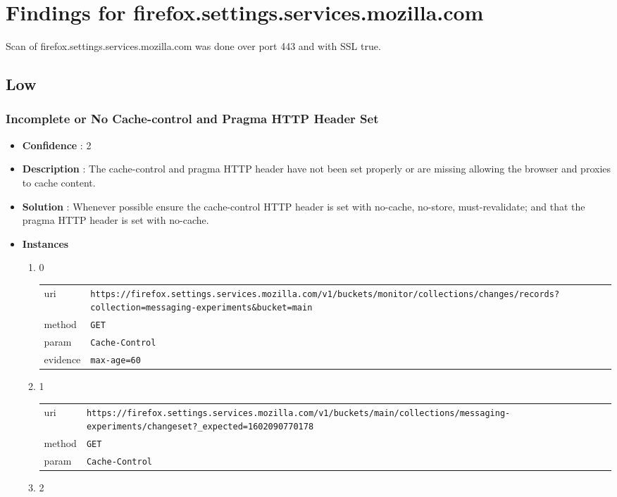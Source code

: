 \documentclass[10pt]{article}
\begin{document}
\section{Findings for firefox.settings.services.mozilla.com}
Scan of firefox.settings.services.mozilla.com was done over port 443 and with SSL true.
\subsection{Low}
\subsubsection{Incomplete or No Cache-control and Pragma HTTP Header Set}
\begin{itemize}
\item[] \textbf{Confidence} : 2
\item[] \textbf{Description} : The cache-control and pragma HTTP header have not been set properly or are missing allowing the browser and proxies to cache content.
\item[] \textbf{Solution} :  Whenever possible ensure the cache-control HTTP header is set with no-cache, no-store, must-revalidate; and that the pragma HTTP header is set with no-cache.
\item[] \textbf{Instances}
\begin{enumerate}
\item[] 0
\begin{tabular}{| l | p{12cm}}
uri & \texttt{https://firefox.settings.services.mozilla.com/v1/buckets/monitor/collections/changes/records?collection=messaging-experiments\&bucket=main} \\
method & \texttt{GET} \\
param & \texttt{Cache-Control} \\
evidence & \texttt{max-age=60} \\
\end{tabular}
\item[] 1
\begin{tabular}{| l | p{12cm}}
uri & \texttt{https://firefox.settings.services.mozilla.com/v1/buckets/main/collections/messaging-experiments/changeset?\_expected=1602090770178} \\
method & \texttt{GET} \\
param & \texttt{Cache-Control} \\
\end{tabular}
\item[] 2
\begin{tabular}{| l | p{12cm}}

\end{tabular}
\end{enumerate}
\end{itemize}
\end{document}
